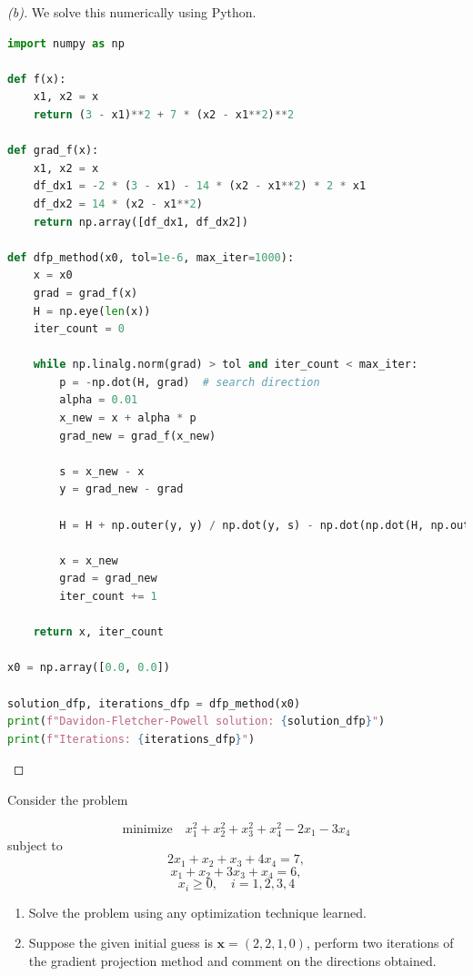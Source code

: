 \documentclass{article}
\begin{document}
\begin{proof}[(b)]
We solve this numerically using Python. 
\begin{lstlisting}[language=Python]
import numpy as np

def f(x):
    x1, x2 = x
    return (3 - x1)**2 + 7 * (x2 - x1**2)**2

def grad_f(x):
    x1, x2 = x
    df_dx1 = -2 * (3 - x1) - 14 * (x2 - x1**2) * 2 * x1
    df_dx2 = 14 * (x2 - x1**2)
    return np.array([df_dx1, df_dx2])

def dfp_method(x0, tol=1e-6, max_iter=1000):
    x = x0
    grad = grad_f(x)
    H = np.eye(len(x))
    iter_count = 0
    
    while np.linalg.norm(grad) > tol and iter_count < max_iter:
        p = -np.dot(H, grad)  # search direction
        alpha = 0.01  
        x_new = x + alpha * p
        grad_new = grad_f(x_new)
        
        s = x_new - x
        y = grad_new - grad
        
        H = H + np.outer(y, y) / np.dot(y, s) - np.dot(np.dot(H, np.outer(s, s)), H) / np.dot(s, np.dot(H, s))
        
        x = x_new
        grad = grad_new
        iter_count += 1
    
    return x, iter_count

x0 = np.array([0.0, 0.0])

solution_dfp, iterations_dfp = dfp_method(x0)
print(f"Davidon-Fletcher-Powell solution: {solution_dfp}")
print(f"Iterations: {iterations_dfp}")
\end{lstlisting}
\end{proof}

\begin{question*}[3]
    Consider the problem

    \[
    \text{minimize} \quad x_1^2 + x_2^2 + x_3^2 + x_4^2 - 2x_1 - 3x_4
    \]
    subject to
    \[
    2x_1 + x_2 + x_3 + 4x_4 = 7,
    \]
    \[
    x_1 + x_2 + 3x_3 + x_4 = 6,
    \]
    \[
    x_i \geq 0, \quad i = 1, 2, 3, 4
    \]

    \begin{enumerate}[label=(\alph*)]
        \item Solve the problem using any optimization technique learned.
        \item Suppose the given initial guess is \( \mathbf{x} = (2, 2, 1, 0) \), perform two iterations of the gradient projection method and comment on the directions obtained.
    \end{enumerate}
\end{question*}
\end{document}
